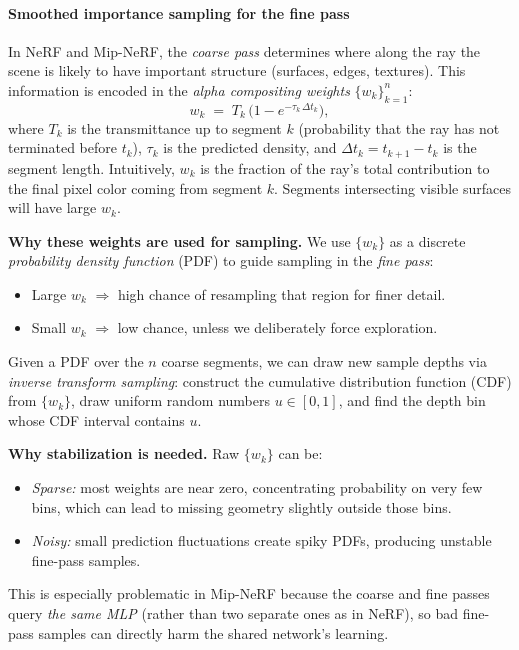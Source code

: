 \begin{enrichment}
\begin{enrichment}
    \paragraph{Smoothed importance sampling for the fine pass}
    In NeRF and Mip-NeRF, the \emph{coarse pass} determines where along the ray the scene is likely to have important structure (surfaces, edges, textures). This information is encoded in the \emph{alpha compositing weights} $\{w_k\}_{k=1}^n$:
    \[
    w_k \;=\; T_k \,\big(1 - e^{-\tau_k\,\Delta t_k}\big),
    \]
    where $T_k$ is the transmittance up to segment $k$ (probability that the ray has not terminated before $t_k$), $\tau_k$ is the predicted density, and $\Delta t_k = t_{k+1}-t_k$ is the segment length.  
    Intuitively, $w_k$ is the fraction of the ray’s total contribution to the final pixel color coming from segment $k$. Segments intersecting visible surfaces will have large $w_k$.
    
    \medskip
    \noindent
    \textbf{Why these weights are used for sampling.}  
    We use $\{w_k\}$ as a discrete \emph{probability density function} (PDF) to guide sampling in the \emph{fine pass}:
    \begin{itemize}
        \item Large $w_k$ $\Rightarrow$ high chance of resampling that region for finer detail.
        \item Small $w_k$ $\Rightarrow$ low chance, unless we deliberately force exploration.
    \end{itemize}
    Given a PDF over the $n$ coarse segments, we can draw new sample depths via \emph{inverse transform sampling}: construct the cumulative distribution function (CDF) from $\{w_k\}$, draw uniform random numbers $u \in [0,1]$, and find the depth bin whose CDF interval contains $u$.
    
    \medskip
    \noindent
    \textbf{Why stabilization is needed.}  
    Raw $\{w_k\}$ can be:
    \begin{itemize}
        \item \emph{Sparse:} most weights are near zero, concentrating probability on very few bins, which can lead to missing geometry slightly outside those bins.
        \item \emph{Noisy:} small prediction fluctuations create spiky PDFs, producing unstable fine-pass samples.
    \end{itemize}
    This is especially problematic in Mip-NeRF because the coarse and fine passes query \emph{the same MLP} (rather than two separate ones as in NeRF), so bad fine-pass samples can directly harm the shared network’s learning.
    

\end{enrichment}
\end{enrichment}
